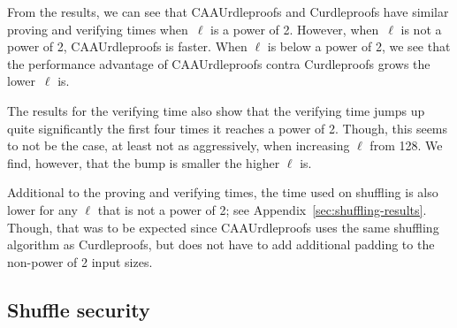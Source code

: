 From the results, we can see that CAAUrdleproofs and Curdleproofs have similar proving and verifying times when~$\ell$ is a power of 2.
However, when~$\ell$ is not a power of 2, CAAUrdleproofs is faster.
When $\ell$ is below a power of 2, we see that the performance advantage of CAAUrdleproofs contra Curdleproofs grows the lower~$\ell$ is.

The results for the verifying time also show that the verifying time jumps up quite significantly the first four times it reaches a power of 2.
Though, this seems to not be the case, at least not as aggressively, when increasing $\ell$ from 128.
We find, however, that the bump is smaller the higher $\ell$ is.

Additional to the proving and verifying times, the time used on shuffling is also lower for any $\ell$ that is not a power of 2; see Appendix~\ref{sec:shuffling-results}.
Though, that was to be expected since CAAUrdleproofs uses the same shuffling algorithm as Curdleproofs, but does not have to add additional padding to the non-power of 2 input sizes.



\subsection{Shuffle security}\label{subsec:Shuffle-security}

